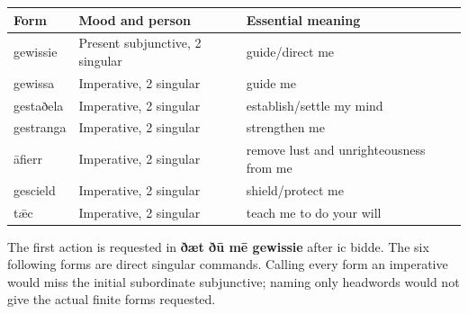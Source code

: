\par\begin{minipage}{\linewidth}\raggedright
\par\begingroup
\fontsize{10.5}{13.2}\selectfont
\setlength{\LTleft}{0pt}\setlength{\LTright}{\fill}
\noindent
\begin{tabular}{@{}>{\raggedright\arraybackslash}p{20.8mm}>{\raggedright\arraybackslash}p{42.75mm}>{\raggedright\arraybackslash}p{54.82mm}@{}}
\toprule
\textbf{Form} & \textbf{Mood and person} & \textbf{Essential meaning} \\
\midrule
gewissie & Present subjunctive, 2 singular & guide/\allowbreak{}direct me \\
gewissa & Imperative, 2 singular & guide me \\
gestaðela & Imperative, 2 singular & establish/\allowbreak{}settle my mind \\
gestranga & Imperative, 2 singular & strengthen me \\
āfierr & Imperative, 2 singular & remove lust and unrighteousness from me \\
gescield & Imperative, 2 singular & shield/\allowbreak{}protect me \\
tǣc & Imperative, 2 singular & teach me to do your will \\
\bottomrule
\end{tabular}
\par\endgroup

The first action is requested in \textbf{ðæt ðū mē gewissie} after ic bidde. The six following forms are direct singular commands. Calling every form an imperative would miss the initial subordinate subjunctive; naming only headwords would not give the actual finite forms requested.

\end{minipage}\par\addvspace{4pt}

